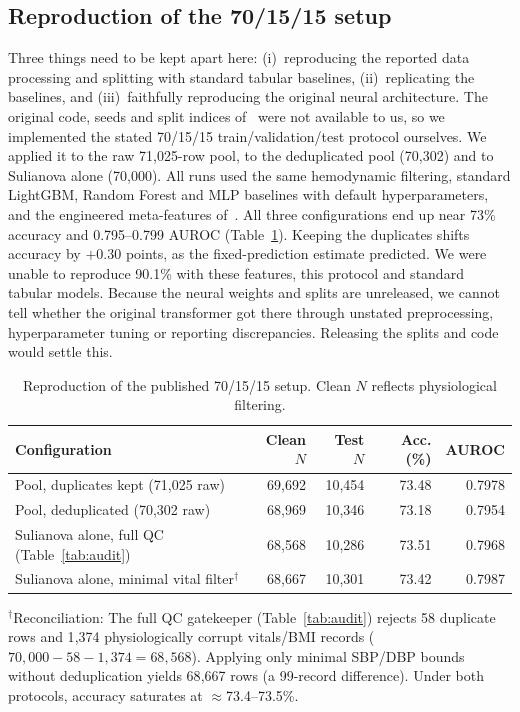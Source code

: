 \documentclass[conference]{IEEEtran}
\begin{document}
\subsection{Reproduction of the 70/15/15 setup}
Three things need to be kept apart here: (i)~reproducing the reported data processing and splitting with standard tabular baselines, (ii)~replicating the baselines, and (iii)~faithfully reproducing the original neural architecture. The original code, seeds and split indices of~\cite{mahmud2026} were not available to us, so we implemented the stated 70/15/15 train/validation/test protocol ourselves. We applied it to the raw 71{,}025-row pool, to the deduplicated pool (70{,}302) and to Sulianova alone (70{,}000). All runs used the same hemodynamic filtering, standard LightGBM, Random Forest and MLP baselines with default hyperparameters, and the engineered meta-features of~\cite{mahmud2026}. All three configurations end up near 73\% accuracy and 0.795--0.799 AUROC (Table~\ref{tab:repro}). Keeping the duplicates shifts accuracy by $+0.30$ points, as the fixed-prediction estimate predicted. We were unable to reproduce 90.1\% with these features, this protocol and standard tabular models. Because the neural weights and splits are unreleased, we cannot tell whether the original transformer got there through unstated preprocessing, hyperparameter tuning or reporting discrepancies. Releasing the splits and code would settle this.

\begin{table}[t]
\caption{Reproduction of the published 70/15/15 setup. Clean $N$ reflects physiological filtering.}
\label{tab:repro}
\centering\footnotesize
\setlength{\tabcolsep}{3pt}
\begin{tabular}{p{3.1cm}rrrr}
\toprule
Configuration & Clean $N$ & Test $N$ & Acc. (\%) & AUROC\\
\midrule
Pool, duplicates kept (71{,}025 raw) & 69{,}692 & 10{,}454 & 73.48 & 0.7978\\
Pool, deduplicated (70{,}302 raw) & 68{,}969 & 10{,}346 & 73.18 & 0.7954\\
Sulianova alone, full QC (Table~\ref{tab:audit}) & 68{,}568 & 10{,}286 & 73.51 & 0.7968\\
Sulianova alone, minimal vital filter$^\dagger$ & 68{,}667 & 10{,}301 & 73.42 & 0.7987\\
\bottomrule
\end{tabular}
\vspace{1.5pt}
{\scriptsize $^\dagger$Reconciliation: The full QC gatekeeper (Table~\ref{tab:audit}) rejects 58 duplicate rows and 1{,}374 physiologically corrupt vitals/BMI records ($70{,}000 - 58 - 1{,}374 = 68{,}568$). Applying only minimal SBP/DBP bounds without deduplication yields 68{,}667 rows (a 99-record difference). Under both protocols, accuracy saturates at $\approx$73.4--73.5\%.\par}
\end{table}
\end{document}
